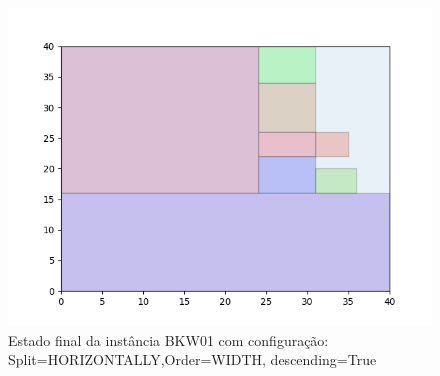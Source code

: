 \begin{figure}[H]
    \centering
    \caption[]{Estado final da instância BKW01 com configuração: Split=HORIZONTALLY,Order=WIDTH, descending=True}
    \label{fig:bkw01-horizontally-width-true}
    \includegraphics[scale=0.5]{output/figures/bkw/bkw01/horizontally/width/true/00}
\end{figure}